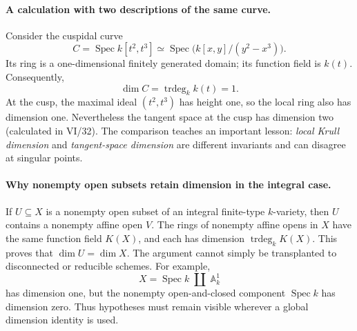 \paragraph{A calculation with two descriptions of the same curve.}
Consider the cuspidal curve
\[
 C=\operatorname{Spec}k[t^2,t^3]
 \simeq \operatorname{Spec}\bigl(k[x,y]/(y^2-x^3)\bigr).
\]
Its ring is a one-dimensional finitely generated domain; its
function field is \(k(t)\).  Consequently,
\[
 \dim C=\operatorname{trdeg}_k k(t)=1.
\]
At the cusp, the maximal ideal \((t^2,t^3)\) has height one, so
the local ring also has dimension one.  Nevertheless the tangent
space at the cusp has dimension two (calculated in VI/32).
The comparison teaches an important lesson: \emph{local Krull
dimension} and \emph{tangent-space dimension} are different
invariants and can disagree at singular points.

\paragraph{Why nonempty open subsets retain dimension in the integral case.}
If \(U\subseteq X\) is a nonempty open subset of an integral
finite-type \(k\)-variety, then \(U\) contains a nonempty affine
open \(V\).  The rings of nonempty affine opens in \(X\) have the
same function field \(K(X)\), and each has dimension
\(\operatorname{trdeg}_k K(X)\).  This proves that \(\dim U=\dim X\).
The argument cannot simply be transplanted to disconnected or
reducible schemes.  For example,
\[
 X=\operatorname{Spec}k\;\amalg\;\mathbb A^1_k
\]
has dimension one, but the nonempty open-and-closed component
\(\operatorname{Spec}k\) has dimension zero.  Thus hypotheses
must remain visible wherever a global dimension identity is used.

